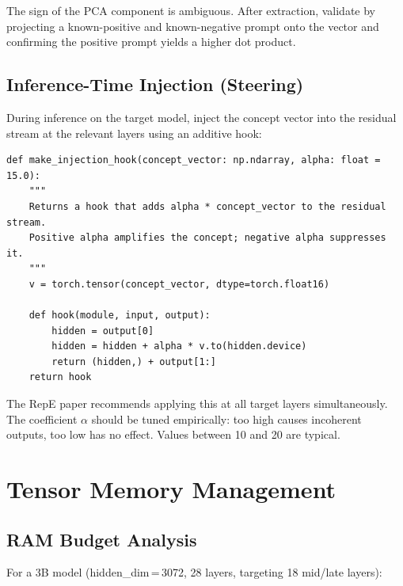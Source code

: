 \documentclass[11pt, a4paper]{article}
\begin{document}
The sign of the PCA component is ambiguous. After extraction, validate by
projecting a known-positive and known-negative prompt onto the vector and
confirming the positive prompt yields a higher dot product.

\subsection{Inference-Time Injection (Steering)}

During inference on the target model, inject the concept vector into the
residual stream at the relevant layers using an additive hook:

\begin{codebox}
\begin{lstlisting}[style=python]
def make_injection_hook(concept_vector: np.ndarray, alpha: float = 15.0):
    """
    Returns a hook that adds alpha * concept_vector to the residual stream.
    Positive alpha amplifies the concept; negative alpha suppresses it.
    """
    v = torch.tensor(concept_vector, dtype=torch.float16)

    def hook(module, input, output):
        hidden = output[0]
        hidden = hidden + alpha * v.to(hidden.device)
        return (hidden,) + output[1:]
    return hook
\end{lstlisting}
\end{codebox}

The RepE paper recommends applying this at all target layers simultaneously.
The coefficient $\alpha$ should be tuned empirically: too high causes incoherent
outputs, too low has no effect. Values between 10 and 20 are typical.

\section{Tensor Memory Management}

\subsection{RAM Budget Analysis}

For a 3B model (hidden\_dim\,=\,3072, 28 layers, targeting 18 mid/late layers):
\end{document}
